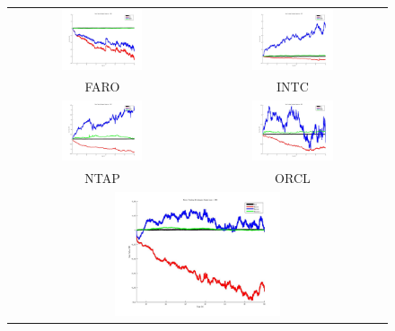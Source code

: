 \begin{figure}[h]
  \centering
  \begin{tabular}{cc}
  	\includegraphics[width=0.45\textwidth]{Figs/fig-compare-strat-FARO} & \includegraphics[width=0.45\textwidth]{Figs/fig-compare-strat-INTC} \\
  	FARO & INTC \\
  	\includegraphics[width=0.45\textwidth]{Figs/fig-compare-strat-NTAP} & \includegraphics[width=0.45\textwidth]{Figs/fig-compare-strat-ORCL} \\
  	  	NTAP & ORCL \\
    \multicolumn{2}{c}{\includegraphics[width=0.45\textwidth]{Figs/fig-compare-strat-SMH} }\\

\end{tabular}
\end{figure}
